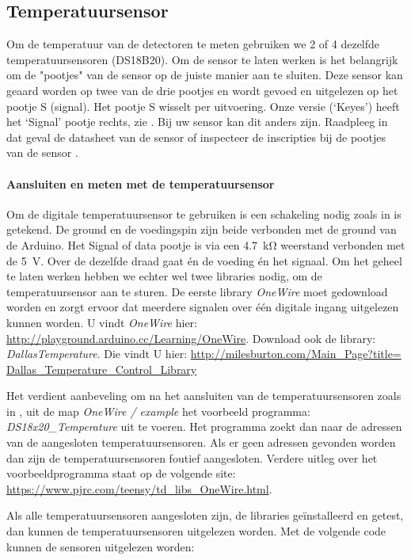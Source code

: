 \subsection{Temperatuursensor}

Om de temperatuur van de detectoren te meten gebruiken we 2 of 4
dezelfde temperatuursensoren (DS18B20). Om de sensor te laten werken is
het belangrijk om de "pootjes" van de sensor op de juiste manier aan te
sluiten. Deze sensor kan geaard worden op twee van de drie pootjes en
wordt gevoed en uitgelezen op het pootje S (signal). Het pootje S
wisselt per uitvoering. Onze versie (`Keyes') heeft het `Signal' pootje
rechts,  zie . Bij uw sensor kan dit anders zijn.
Raadpleeg in dat geval de datasheet van de sensor of inspecteer de
inscripties bij de pootjes van de sensor .

\paragraph{Aansluiten en meten met de temperatuursensor}

Om de digitale temperatuursensor te gebruiken is een schakeling nodig
zoals in  is getekend. De ground en de
voedingspin zijn beide verbonden met de ground van de Arduino. Het
Signal of data pootje is via een \SI{4.7}{\kilo\ohm} weerstand verbonden
met de \SI{5}{\volt}. Over de dezelfde draad gaat én de voeding én het
signaal. Om het geheel te laten werken hebben we echter wel twee
libraries nodig, om de temperatuursensor aan te sturen. De eerste
library \emph{OneWire} moet gedownload worden en zorgt ervoor dat
meerdere signalen over één digitale ingang uitgelezen kunnen worden. U
vindt \emph{OneWire} hier:
\url{http://playground.arduino.cc/Learning/OneWire}. Download ook de
library: \emph{DallasTemperature}. Die vindt U hier:
\url{http://milesburton.com/Main_Page?title=
Dallas_Temperature_Control_Library}

Het verdient aanbeveling om na het aansluiten van de temperatuursensoren
zoals in , uit de map \emph{OneWire /
example} het voorbeeld programma: \emph{DS18x20\_Temperature} uit te
voeren. Het programma zoekt dan naar de adressen van de aangesloten
temperatuursensoren. Als er geen adressen gevonden worden dan zijn de
temperatuursensoren foutief aangesloten. Verdere uitleg over het
voorbeeldprogramma staat op de volgende site:
\url{https://www.pjrc.com/teensy/td_libs_OneWire.html}.

Als alle temperatuursensoren aangesloten zijn, de libraries
ge\"{i}nstalleerd en getest, dan kunnen de temperatuursensoren
uitgelezen worden. Met de volgende code kunnen de sensoren uitgelezen
worden:


